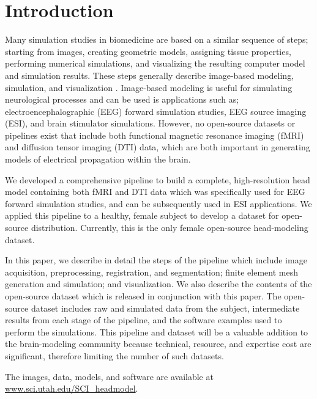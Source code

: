 
\section{Introduction}
\label{sec:intro}

Many simulation studies in biomedicine are based on a similar sequence of steps; starting from images, creating geometric models, assigning tissue properties, performing numerical simulations, and visualizing the resulting computer model and simulation results. These steps generally describe image-based modeling, simulation, and visualization \cite{SCI:Mac2009a,SCI:Joh2015c,SCI:Joh2012a,SCI:Joh2006a,SCI:Joh2004b}. Image-based modeling is useful for simulating neurological processes and can be used is applications such as; electroencephalographic (EEG) forward simulation studies, EEG source imaging (ESI), and brain stimulator simulations. However, no open-source datasets or pipelines exist that include both functional magnetic resonance imaging (fMRI) and diffusion tensor imaging (DTI) data, which are both important in generating models of electrical propagation within the brain. 

We developed a comprehensive pipeline to build a complete, high-resolution head model containing both fMRI and DTI data which was specifically used for EEG forward simulation studies, and can be subsequently used in ESI applications. We applied this pipeline to a healthy, female subject to develop a dataset for open-source distribution. Currently, this is the only female open-source head-modeling dataset.

In this paper, we describe in detail the steps of the pipeline which include image acquisition, preprocessing, registration, and segmentation; finite element mesh generation and simulation; and visualization. We also describe the contents of the open-source dataset which is released in conjunction with this paper. The open-source dataset includes raw and simulated data from the subject, intermediate results from each stage of the pipeline, and the software examples used to perform the simulations. This pipeline and dataset will be a valuable addition to the brain-modeling community because technical, resource, and expertise cost are significant, therefore limiting the number of such datasets. 

The images, data, models, and software are available at \url{www.sci.utah.edu/SCI_headmodel}.